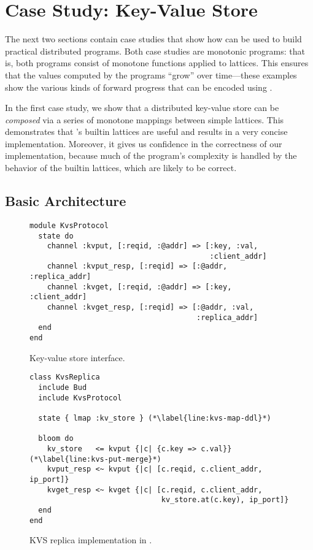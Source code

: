 \section{Case Study: Key-Value Store}
\label{sec:kvs}
The next two sections contain case studies that show how \lang can be used to
build practical distributed programs. Both case studies are monotonic programs:
that is, both programs consist of monotone functions applied to lattices. This
ensures that the values computed by the programs ``grow'' over time---these
examples show the various kinds of forward progress that can be encoded using
\lang.

In the first case study, we show that a distributed key-value store can be
\emph{composed} via a series of monotone mappings between simple lattices. This
demonstrates that \lang's builtin lattices are useful and results in a very
concise implementation. Moreover, it gives us confidence in the correctness of
our implementation, because much of the program's complexity is handled by the
behavior of the builtin lattices, which are likely to be correct.

\subsection{Basic Architecture}
\begin{figure}[t]
\begin{scriptsize}
\begin{lstlisting}
module KvsProtocol
  state do
    channel :kvput, [:reqid, :@addr] => [:key, :val,
                                         :client_addr]
    channel :kvput_resp, [:reqid] => [:@addr, :replica_addr]
    channel :kvget, [:reqid, :@addr] => [:key, :client_addr]
    channel :kvget_resp, [:reqid] => [:@addr, :val,
                                      :replica_addr]
  end
end
\end{lstlisting}
\end{scriptsize}
\caption{Key-value store interface.}
\label{fig:kvs-interface}
\end{figure}

\begin{figure}[t]
\begin{scriptsize}
\begin{lstlisting}
class KvsReplica
  include Bud
  include KvsProtocol

  state { lmap :kv_store } (*\label{line:kvs-map-ddl}*)

  bloom do
    kv_store   <= kvput {|c| {c.key => c.val}} (*\label{line:kvs-put-merge}*)
    kvput_resp <~ kvput {|c| [c.reqid, c.client_addr, ip_port]}
    kvget_resp <~ kvget {|c| [c.reqid, c.client_addr,
                              kv_store.at(c.key), ip_port]}
  end
end
\end{lstlisting}
\end{scriptsize}
\caption{KVS replica implementation in \lang.}
\label{fig:kvs-replica}
\end{figure}

